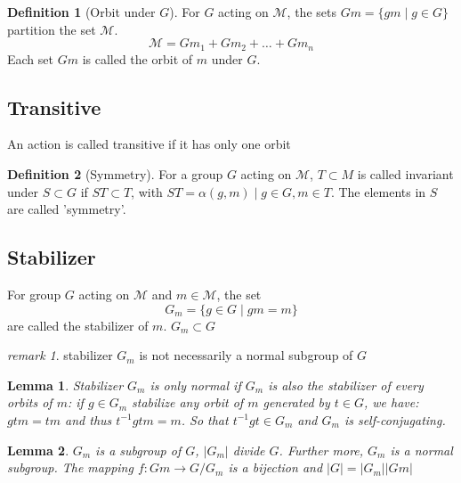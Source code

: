 \documentclass{amsart}
\newcommand{\setM}{\mathcal{M}}
\newtheorem*{lemma}{Lemma}
\theoremstyle{remark}
\newtheorem*{remark}{remark}
\theoremstyle{remark}
\theoremstyle{definition}
\newtheorem*{definition}{Definition}
\begin{document}
\vspace{10pt}

\begin{definition}
    [Orbit under $G$]
    For $G$ acting on $\setM$, the sets $Gm = \{gm\mid g\in G\}$ partition the set $\setM$. 
    \[\setM = Gm_1 + Gm_2 + \dots + Gm_n\]
    Each set $Gm$ is called the orbit of $m$ under $G$.
\end{definition}

\subsection*{Transitive}
An action is called transitive if it has only one orbit

\begin{definition}
    [Symmetry]
    For a group $G$ acting on $\setM$, $T\subset M$ is called invariant under $S \subset G$ if $ST\subset T$, 
    with $ST = {\alpha(g,m)\mid g \in G, m\in T}$. 
    The elements in $S$ are called 'symmetry'.
\end{definition}

\vspace{10pt}

\subsection*{Stabilizer}
For group $G$ acting on $\setM$ and $m \in \setM$, the set 
\[G_m = \{ g\in G\mid gm = m \}\]
are called the stabilizer of $m$. $G_m \subset G$
\begin{remark}
    stabilizer $G_m$ is not necessarily a normal subgroup of $G$
\end{remark}

\begin{lemma}
    Stabilizer $G_m$ is only normal if $G_m$ is also the stabilizer of every orbits of $m$: 
    if $g\in G_m$ stabilize any orbit of $m$ generated by $t\in G$, 
    we have: $gtm = tm$ and thus $t^{-1}gtm = m$. So that $t^{-1}gt \in G_m$ and $G_m$ is self-conjugating. 
\end{lemma}

\begin{lemma}
    $G_m$ is a subgroup of $G$, $|G_m|$ divide $G$. Further more, $G_m$ is a normal subgroup. 
    The mapping $f\colon Gm \to G/G_m$ is a bijection and $|G|=|G_m||Gm|$
\end{lemma}
\end{document}
